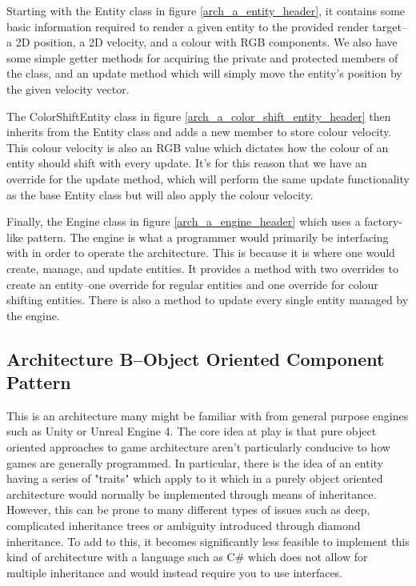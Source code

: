 \documentclass{article}
\begin{document}
Starting with the Entity class in figure \ref{arch_a_entity_header}, it contains
some basic information required to render a given entity to the provided render
target--a 2D position, a 2D velocity, and a colour with RGB components. We also
have some simple getter methods for acquiring the private and protected members
of the class, and an update method which will simply move the entity's position
by the given velocity vector.

The ColorShiftEntity class in figure \ref{arch_a_color_shift_entity_header} then
inherits from the Entity class and adds a new member to store colour velocity.
This colour velocity is also an RGB value which dictates how the colour of an
entity should shift with every update. It's for this reason that we have an
override for the update method, which will perform the same update functionality
as the base Entity class but will also apply the colour velocity.

Finally, the Engine class in figure \ref{arch_a_engine_header} which uses a
factory-like pattern. The engine is what a programmer would primarily be
interfacing with in order to operate the architecture. This is because it is
where one would create, manage, and update entities. It provides a method with
two overrides to create an entity--one override for regular entities and one
override for colour shifting entities. There is also a method to update every
single entity managed by the engine.

\subsection{Architecture B--Object Oriented Component Pattern}
This is an architecture many might be familiar with from general purpose engines
such as Unity or Unreal Engine 4. The core idea at play is that pure object
oriented approaches to game architecture aren't particularly conducive to how
games are generally programmed. In particular, there is the idea of an entity
having a series of "traits" which apply to it which in a purely object oriented
architecture would normally be implemented through means of inheritance.
However, this can be prone to many different types of issues such as deep,
complicated inheritance trees or ambiguity introduced through diamond
inheritance. To add to this, it becomes significantly less feasible to implement
this kind of architecture with a language such as C\# which does not allow for
multiple inheritance and would instead require you to use interfaces.
\end{document}

